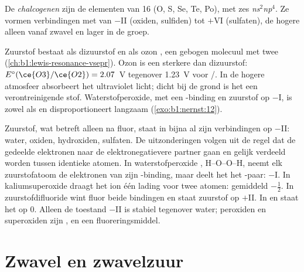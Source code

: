 \begin{definition}[Chalcogenen]\label{def:b1:p-block-16-18:chalcogen}
De \emph{chalcogenen} zijn de elementen van  16
(O, S, Se, Te, Po), met zes  \textit{ns}$^2$\textit{np}$^4$.
Ze vormen verbindingen met  van $-$II (oxiden, sulfiden)
tot $+$VI (sulfaten), de hogere alleen vanaf zwavel en lager in de groep.
\end{definition}

Zuurstof bestaat als dizuurstof  en als ozon , een gebogen
molecuul met twee  (\cref{ch:b1:lewis-resonance-vsepr}).
Ozon is een sterkere  dan dizuurstof: $E^\circ(\ce{O3}/\ce{O2}) = 2.07$~V tegenover 1.23~V voor /. In de hogere atmosfeer
absorbeert het ultraviolet licht; dicht bij de grond is het een
verontreinigende stof. Waterstofperoxide, met een -binding en
zuurstof op $-$I, is zowel  als  en disproportioneert
langzaam (\cref{exo:b1:nernst:12}).

\begin{example}
Zuurstof, wat  betreft alleen na fluor, staat in
bijna al zijn verbindingen op $-$II: water, oxiden, hydroxiden, sulfaten.
De uitzonderingen volgen uit de regel dat de gedeelde elektronen naar de
elektronegatievere partner gaan en gelijk verdeeld worden tussen
identieke atomen. In waterstofperoxide , H--O--O--H, neemt elk
zuurstofatoom de elektronen van zijn -binding, maar deelt het het
-paar: $-$I. In kaliumsuperoxide  draagt het ion 
één lading voor twee atomen: gemiddeld $-\frac12$. In zuurstofdifluoride
 wint fluor beide bindingen en staat zuurstof op $+$II. In
 en  staat het op 0. Alleen de toestand $-$II is stabiel
tegenover water; peroxiden en superoxiden zijn , en 
een fluoreringsmiddel.
\end{example}

\section{Zwavel en zwavelzuur}

